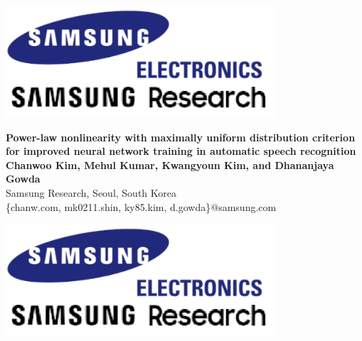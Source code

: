 \documentclass[a0,portrait]{a0poster}
\begin{document}


\begin{minipage}[t]{1.0\linewidth}
\begin{center}
  \begin{minipage}[t]{0.1\textwidth}
    \centering
    \vspace{0pt}
    \includegraphics[width=10cm, valign=t]{samsung_research} %
  \end{minipage} \hfill
  \begin{minipage}[t]{0.7\textwidth}
    \begin{center}
  \huge \color{NavyBlue} 
      \textbf{Power-law nonlinearity with maximally uniform distribution criterion for
      improved neural network training in automatic speech recognition} \\
      \LARGE \textbf{Chanwoo Kim, Mehul Kumar, Kwangyoun Kim, and Dhananjaya Gowda}
  \\
\LARGE Samsung Research, Seoul, South Korea\\ %
\large \{chanw.com, mk0211.shin, ky85.kim, d.gowda\}@samsung.com
    \end{center}
  \end{minipage}
  \begin{minipage}[t]{0.1\textwidth}
    \begin{center}
    \includegraphics[width=10cm]{samsung_research} %
    \end{center}
  \end{minipage} \hfill
\end{center}
\end{minipage}
\end{document}
